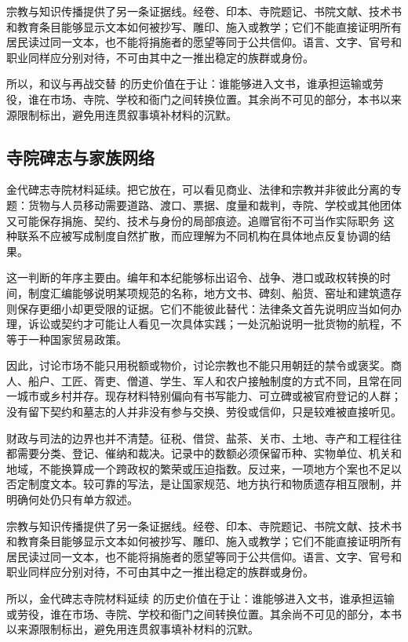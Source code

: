 宗教与知识传播提供了另一条证据线。经卷、印本、寺院题记、书院文献、技术书和教育条目能够显示文本如何被抄写、雕印、施入或教学；它们不能直接证明所有居民读过同一文本，也不能将捐施者的愿望等同于公共信仰。语言、文字、官号和职业同样应分别对待，不可由其中之一推出稳定的族群或身份。

所以，和议与再战交替 的历史价值在于让：谁能够进入文书，谁承担运输或劳役，谁在市场、寺院、学校和衙门之间转换位置。其余尚不可见的部分，本书以来源限制标出，避免用连贯叙事填补材料的沉默。

\subsection{寺院碑志与家族网络}

金代碑志寺院材料延续。把它放在，可以看见商业、法律和宗教并非彼此分离的专题：货物与人员移动需要道路、渡口、票据、度量和裁判，寺院、学校或其他团体又可能保存捐施、契约、技术与身份的局部痕迹。追赠官衔不可当作实际职务 这种联系不应被写成制度自然扩散，而应理解为不同机构在具体地点反复协调的结果。

这一判断的年序主要由。编年和本纪能够标出诏令、战争、港口或政权转换的时间，制度汇编能够说明某项规范的名称，地方文书、碑刻、船货、窑址和建筑遗存则保存更细小却更受限的证据。它们不能彼此替代：法律条文首先说明应当如何办理，诉讼或契约才可能让人看见一次具体实践；一处沉船说明一批货物的航程，不等于一种国家贸易政策。

因此，讨论市场不能只用税额或物价，讨论宗教也不能只用朝廷的禁令或褒奖。商人、船户、工匠、胥吏、僧道、学生、军人和农户接触制度的方式不同，且常在同一城市或乡村并存。现存材料特别偏向有书写能力、可立碑或被官府登记的人群；没有留下契约和墓志的人并非没有参与交换、劳役或信仰，只是较难被直接听见。

财政与司法的边界也并不清楚。征税、借贷、盐茶、关市、土地、寺产和工程往往都需要分类、登记、催纳和裁决。记录中的数额必须保留币种、实物单位、机关和地域，不能换算成一个跨政权的繁荣或压迫指数。反过来，一项地方个案也不足以否定制度文本。较可靠的写法，是让国家规范、地方执行和物质遗存相互限制，并明确何处仍只有单方叙述。

宗教与知识传播提供了另一条证据线。经卷、印本、寺院题记、书院文献、技术书和教育条目能够显示文本如何被抄写、雕印、施入或教学；它们不能直接证明所有居民读过同一文本，也不能将捐施者的愿望等同于公共信仰。语言、文字、官号和职业同样应分别对待，不可由其中之一推出稳定的族群或身份。

所以，金代碑志寺院材料延续 的历史价值在于让：谁能够进入文书，谁承担运输或劳役，谁在市场、寺院、学校和衙门之间转换位置。其余尚不可见的部分，本书以来源限制标出，避免用连贯叙事填补材料的沉默。

